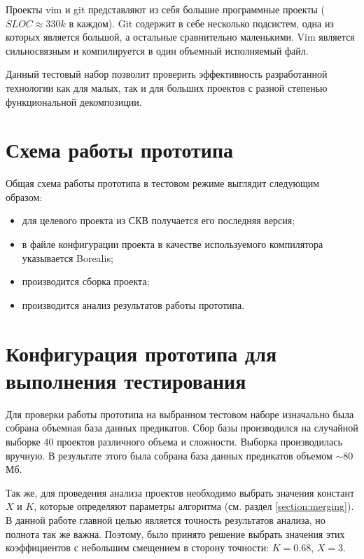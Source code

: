 Проекты vim и git представляют из себя большие программные проекты ($SLOC \approx 330k$ в каждом). Git содержит в себе несколько подсистем, одна из которых является большой, а остальные сравнительно маленькими. Vim является сильносвязным и компилируется в один объемный исполняемый файл.

Данный тестовый набор позволит проверить эффективность разработанной технологии как для малых, так и для больших проектов с разной степенью функциональной декомпозиции.

\section{Схема работы прототипа}
Общая схема работы прототипа в тестовом режиме выглядит следующим образом:
\begin{itemize}
\item для целевого проекта из СКВ получается его последняя версия;
\item в файле конфигурации проекта в качестве используемого компилятора указывается Borealis;
\item производится сборка проекта;
\item производится анализ результатов работы прототипа.
\end{itemize}

\section{Конфигурация прототипа для выполнения тестирования}
Для проверки работы прототипа на выбранном тестовом наборе изначально была собрана объемная база данных предикатов. Сбор базы производился на случайной выборке 40 проектов различного объема и сложности. Выборка производилась вручную. В результате этого была собрана база данных предикатов объемом $\sim{80}$Мб.

Так же, для проведения анализа проектов необходимо выбрать значения констант $X$ и $K$, которые определяют параметры алгоритма (см. раздел \ref{section:merging}). В данной работе главной целью является точность результатов анализа, но полнота так же важна. Поэтому, было принято решение выбрать значения этих коэффициентов с небольшим смещением в сторону точности: $K=0.68$, $X=3$.

